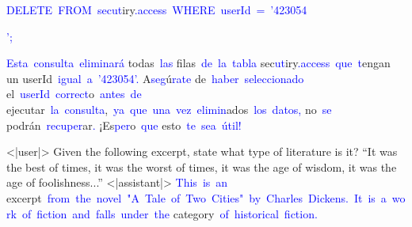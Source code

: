 \documentclass{article}
\begin{document}
\begin{tcolorbox}[colframe=black,colback=white]
{}\textcolor{blue}{DELETE}\textcolor{blue}{~FROM}\textcolor{blue}{~sec}\textcolor{blue}{ut}iry\textcolor{blue}{.access}\textcolor{blue}{~WHERE}\textcolor{blue}{~userId}\textcolor{blue}{~=}\textcolor{blue}{~'}\textcolor{blue}{423}\textcolor{blue}{054}\textcolor{blue}{';

}\textcolor{blue}{Esta}\textcolor{blue}{~consulta}\textcolor{blue}{~eliminar}\textcolor{blue}{á} todas\textcolor{blue}{~las} filas\textcolor{blue}{~de}\textcolor{blue}{~la}\textcolor{blue}{~tabla} sec\textcolor{blue}{ut}iry\textcolor{blue}{.access}\textcolor{blue}{~que}\textcolor{blue}{~t}engan un userId\textcolor{blue}{~igual}\textcolor{blue}{~a}\textcolor{blue}{~'}\textcolor{blue}{423}\textcolor{blue}{054}\textcolor{blue}{'.} A\textcolor{blue}{seg}ú\textcolor{blue}{rate} de\textcolor{blue}{~haber}\textcolor{blue}{~seleccion}\textcolor{blue}{ado} el\textcolor{blue}{~userId}\textcolor{blue}{~correct}o\textcolor{blue}{~antes}\textcolor{blue}{~de} ejecutar\textcolor{blue}{~la}\textcolor{blue}{~consulta},\textcolor{blue}{~ya}\textcolor{blue}{~que}\textcolor{blue}{~una}\textcolor{blue}{~vez}\textcolor{blue}{~elimin}ados\textcolor{blue}{~los}\textcolor{blue}{~datos}\textcolor{blue}{,} no\textcolor{blue}{~se} podrán\textcolor{blue}{~recuper}ar\textcolor{blue}{.} ¡Es\textcolor{blue}{per}o\textcolor{blue}{~que} esto\textcolor{blue}{~te}\textcolor{blue}{~sea}\textcolor{blue}{~ú}\textcolor{blue}{til}\textcolor{blue}{!}\textcolor{blue}{}
\end{tcolorbox}


\begin{tcolorbox}[colframe=black,colback=white]
<|user|>
Given the following excerpt, state what type of literature is it?
“It was the best of times, it was the worst of times, it was the age of wisdom, it was the age of foolishness...”
<|assistant|>
\textcolor{blue}{This}\textcolor{blue}{~is}\textcolor{blue}{~an} excerpt\textcolor{blue}{~from}\textcolor{blue}{~the}\textcolor{blue}{~novel}\textcolor{blue}{~"}\textcolor{blue}{A}\textcolor{blue}{~Tale}\textcolor{blue}{~of}\textcolor{blue}{~Two}\textcolor{blue}{~Cities}\textcolor{blue}{"}\textcolor{blue}{~by}\textcolor{blue}{~Charles}\textcolor{blue}{~Dickens}\textcolor{blue}{.}\textcolor{blue}{~It}\textcolor{blue}{~is}\textcolor{blue}{~a}\textcolor{blue}{~work}\textcolor{blue}{~of}\textcolor{blue}{~fiction}\textcolor{blue}{~and}\textcolor{blue}{~falls}\textcolor{blue}{~under}\textcolor{blue}{~the} category\textcolor{blue}{~of}\textcolor{blue}{~historical}\textcolor{blue}{~fiction}\textcolor{blue}{.}\textcolor{blue}{}
\end{tcolorbox}
\end{document}
